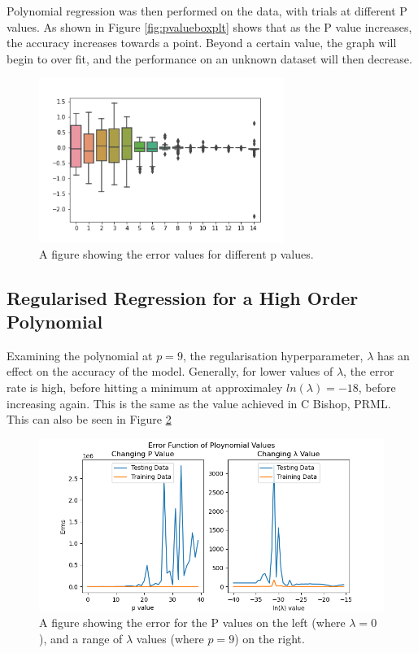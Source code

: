 \documentclass[a4paper, 11pt]{article}
\begin{document}
Polynomial regression was then performed on the data, with trials at different P values. As shown in Figure \ref{fig:pvalueboxplt} shows that as the P value increases, the accuracy increases towards a point. Beyond a certain value, the graph will begin to over fit, and the performance on an unknown dataset will then decrease.

\begin{figure}[h]
    \begin{center}
    \includegraphics[width=8cm]{fig/pvalueboxplot.png}
    \caption{A figure showing the error values for different p values.}
    \label{fig:traintestsplit}     
\end{center}
\end{figure}

\subsection{Regularised Regression for a High Order Polynomial}
\label{sec:changinglamda}

Examining the polynomial at $p=9$, the regularisation hyperparameter, $\lambda$ has an effect on the accuracy of the model. Generally, for lower values of $\lambda$, the error rate is high, before hitting a minimum at approximaley $ln(\lambda) = -18$, before increasing again. This is the same as the value achieved in C Bishop, PRML. This can also be seen in Figure \ref{fig:pandlamchange}
\begin{figure}[h]
    \begin{center}
    \includegraphics[width=16cm]{fig/displaypvalueplot.png}
    \caption{A figure showing the error for the P values on the left (where $\lambda=0$), and a range of $\lambda$ values (where $p=9$) on the right.}
    \label{fig:pandlamchange}     
\end{center}
\end{figure}
\end{document}

